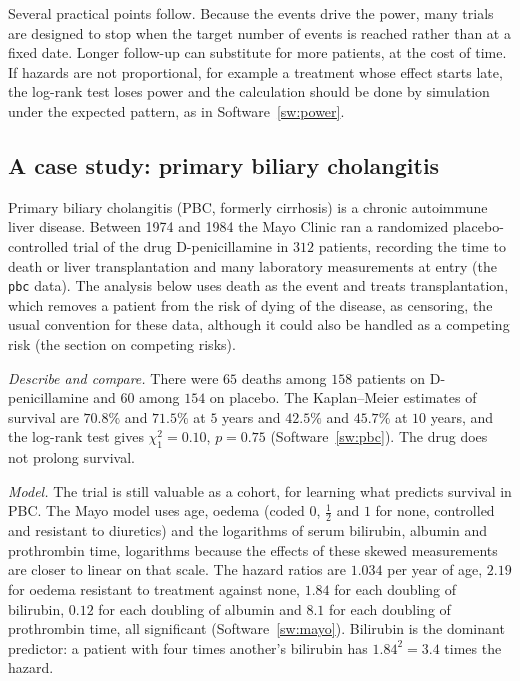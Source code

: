 \documentclass[11pt,a4paper]{article}
\numberwithin{equation}{section}
\theoremstyle{definition}
\begin{document}
Several practical points follow. Because the events drive the power, many trials are designed to stop when the target number of events is reached rather than at a fixed date. Longer follow-up can substitute for more patients, at the cost of time. If hazards are not proportional, for example a treatment whose effect starts late, the log-rank test loses power and the calculation should be done by simulation under the expected pattern, as in Software~\ref{sw:power}.

\subsection{A case study: primary biliary cholangitis}
\label{ssec:casestudy}

Primary biliary cholangitis (PBC, formerly cirrhosis) is a chronic autoimmune liver disease. Between 1974 and 1984 the Mayo Clinic ran a randomized placebo-controlled trial of the drug D-penicillamine in $312$ patients, recording the time to death or liver transplantation and many laboratory measurements at entry (the \texttt{pbc} data). The analysis below uses death as the event
and treats transplantation, which removes a patient from the risk of dying of the disease, as censoring, the usual convention for these data, although it could also be handled as a competing risk (the section on competing risks).

\emph{Describe and compare.} There were $65$ deaths among $158$ patients on D-penicillamine and $60$ among $154$ on placebo. The Kaplan--Meier estimates of survival are $70.8\%$ and $71.5\%$ at $5$ years and $42.5\%$ and $45.7\%$ at $10$ years, and the log-rank test gives $\chi^2_1 = 0.10$, $p = 0.75$ (Software~\ref{sw:pbc}). The drug does not prolong survival.

\emph{Model.} The trial is still valuable as a cohort, for learning what predicts survival in PBC. The Mayo model uses age, oedema (coded $0$, $\frac12$ and $1$ for none, controlled and resistant to diuretics) and the logarithms of serum bilirubin, albumin and prothrombin time, logarithms because the effects of these skewed measurements are closer to linear on that scale. The hazard
ratios are $1.034$ per year of age, $2.19$ for oedema resistant to treatment against none, $1.84$ for each doubling of bilirubin, $0.12$ for each doubling of albumin and $8.1$ for each doubling of prothrombin time, all significant (Software~\ref{sw:mayo}). Bilirubin is the dominant predictor: a patient with four times another's bilirubin has $1.84^2 = 3.4$ times the hazard.
\end{document}
